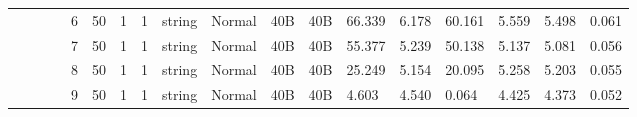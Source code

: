 \begin{landscape}
\begin{table}[]
{\begin{tabular}{@{}ccccllllllllllllll@{}}
                                                                                   &                              &                                &                                                                                                          & 6                                                     & 50                                       & 1                                          & 1                                 & string                           & Normal                             & 40B                                           & 40B                                             & 66.339                  & 6.178    & 60.161                       & 5.559                   & 5.498    & 0.061                        \\
                                                                                   &                              &                                &                                                                                                          & 7                                                     & 50                                       & 1                                          & 1                                 & string                           & Normal                             & 40B                                           & 40B                                             & 55.377                  & 5.239    & 50.138                       & 5.137                   & 5.081    & 0.056                        \\
                                                                                   &                              &                                &                                                                                                          & 8                                                     & 50                                       & 1                                          & 1                                 & string                           & Normal                             & 40B                                           & 40B                                             & 25.249                  & 5.154    & 20.095                       & 5.258                   & 5.203    & 0.055                        \\
                                                                                   &                              &                                &                                                                                                          & 9                                                     & 50                                       & 1                                          & 1                                 & string                           & Normal                             & 40B                                           & 40B                                             & 4.603                   & 4.540    & 0.064                        & 4.425                   & 4.373    & 0.052                        \\

\end{tabular}}
\end{table}
\end{landscape}
